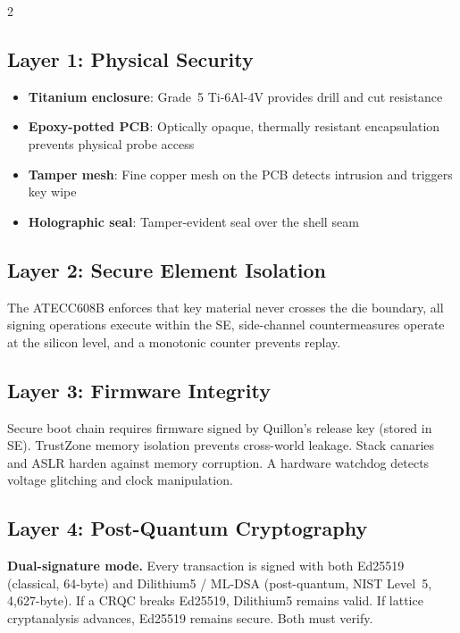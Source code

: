 \documentclass[11pt,a4paper]{article}
\begin{document}
\begin{multicols}{2}
\subsection{Layer 1: Physical Security}

\begin{itemize}[leftmargin=1.2em,itemsep=2pt]
  \item \textbf{Titanium enclosure}: Grade~5 Ti-6Al-4V
    provides drill and cut resistance
  \item \textbf{Epoxy-potted PCB}: Optically opaque, thermally resistant
    encapsulation prevents physical probe access
  \item \textbf{Tamper mesh}: Fine copper mesh on the PCB
    detects intrusion and triggers key wipe
  \item \textbf{Holographic seal}: Tamper-evident seal
    over the shell seam
\end{itemize}

\subsection{Layer 2: Secure Element Isolation}

The ATECC608B enforces that key material never crosses the die boundary,
all signing operations execute within the SE, side-channel countermeasures
operate at the silicon level, and a monotonic counter prevents replay.

\subsection{Layer 3: Firmware Integrity}

Secure boot chain requires firmware signed by Quillon's release key
(stored in SE). TrustZone memory isolation prevents cross-world leakage.
Stack canaries and ASLR harden against memory corruption. A hardware
watchdog detects voltage glitching and clock manipulation.

\subsection{Layer 4: Post-Quantum Cryptography}
\label{sec:crypto}

\begin{description}[leftmargin=0.5em,itemsep=3pt]
  \item[Transaction signatures:] \textbf{Dual-signature mode.} Every
    transaction is signed with both Ed25519 (classical, 64-byte)
    and Dilithium5 / ML-DSA (post-quantum, NIST Level~5,
    4,627-byte). If a CRQC breaks Ed25519, Dilithium5
    remains valid. If lattice cryptanalysis advances, Ed25519 remains
    secure. Both must verify.


\end{description}
\end{multicols}
\end{document}
